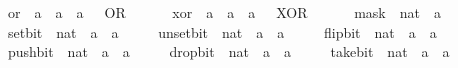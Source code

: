 \begin{isabellebody}
\ \ \ \ \ or\ {\isacharcolon}{\kern0pt}{\isacharcolon}{\kern0pt}\ {\isacartoucheopen}{\isacharprime}{\kern0pt}a\ {\isasymRightarrow}\ {\isacharprime}{\kern0pt}a\ {\isasymRightarrow}\ {\isacharprime}{\kern0pt}a{\isacartoucheclose}\ \ {\isacharparenleft}{\kern0pt}\ {\isacartoucheopen}OR{\isacartoucheclose}\ {}{}{\isacharparenright}{\kern0pt}\isanewline
\ \ \ \ \ xor\ {\isacharcolon}{\kern0pt}{\isacharcolon}{\kern0pt}\ {\isacartoucheopen}{\isacharprime}{\kern0pt}a\ {\isasymRightarrow}\ {\isacharprime}{\kern0pt}a\ {\isasymRightarrow}\ {\isacharprime}{\kern0pt}a{\isacartoucheclose}\ \ {\isacharparenleft}{\kern0pt}\ {\isacartoucheopen}XOR{\isacartoucheclose}\ {}{}{\isacharparenright}{\kern0pt}\isanewline
\ \ \ \ \ mask\ {\isacharcolon}{\kern0pt}{\isacharcolon}{\kern0pt}\ {\isacartoucheopen}nat\ {\isasymRightarrow}\ {\isacharprime}{\kern0pt}a{\isacartoucheclose}\isanewline
\ \ \ \ \ set{\isacharunderscore}{\kern0pt}bit\ {\isacharcolon}{\kern0pt}{\isacharcolon}{\kern0pt}\ {\isacartoucheopen}nat\ {\isasymRightarrow}\ {\isacharprime}{\kern0pt}a\ {\isasymRightarrow}\ {\isacharprime}{\kern0pt}a{\isacartoucheclose}\isanewline
\ \ \ \ \ unset{\isacharunderscore}{\kern0pt}bit\ {\isacharcolon}{\kern0pt}{\isacharcolon}{\kern0pt}\ {\isacartoucheopen}nat\ {\isasymRightarrow}\ {\isacharprime}{\kern0pt}a\ {\isasymRightarrow}\ {\isacharprime}{\kern0pt}a{\isacartoucheclose}\isanewline
\ \ \ \ \ flip{\isacharunderscore}{\kern0pt}bit\ {\isacharcolon}{\kern0pt}{\isacharcolon}{\kern0pt}\ {\isacartoucheopen}nat\ {\isasymRightarrow}\ {\isacharprime}{\kern0pt}a\ {\isasymRightarrow}\ {\isacharprime}{\kern0pt}a{\isacartoucheclose}\isanewline
\ \ \ \ \ push{\isacharunderscore}{\kern0pt}bit\ {\isacharcolon}{\kern0pt}{\isacharcolon}{\kern0pt}\ {\isacartoucheopen}nat\ {\isasymRightarrow}\ {\isacharprime}{\kern0pt}a\ {\isasymRightarrow}\ {\isacharprime}{\kern0pt}a{\isacartoucheclose}\isanewline
\ \ \ \ \ drop{\isacharunderscore}{\kern0pt}bit\ {\isacharcolon}{\kern0pt}{\isacharcolon}{\kern0pt}\ {\isacartoucheopen}nat\ {\isasymRightarrow}\ {\isacharprime}{\kern0pt}a\ {\isasymRightarrow}\ {\isacharprime}{\kern0pt}a{\isacartoucheclose}\isanewline
\ \ \ \ \ take{\isacharunderscore}{\kern0pt}bit\ {\isacharcolon}{\kern0pt}{\isacharcolon}{\kern0pt}\ {\isacartoucheopen}nat\ {\isasymRightarrow}\ {\isacharprime}{\kern0pt}a\ {\isasymRightarrow}\ {\isacharprime}{\kern0pt}a{\isacartoucheclose}\isanewline

\end{isabellebody}
